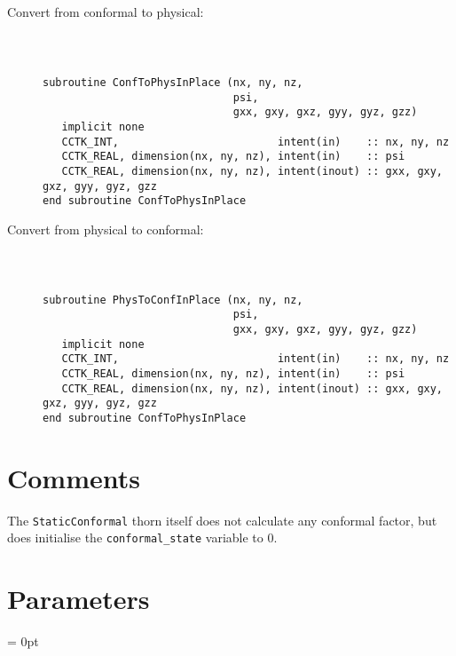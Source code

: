 \documentclass{article}
\newlength{\tableWidth} \newlength{\maxVarWidth} \newlength{\paraWidth} \newlength{\descWidth}
\begin{document}
\begin{description}

\item[Convert from conformal to physical:]

{\tt
\begin{verbatim}

subroutine ConfToPhysInPlace (nx, ny, nz,
                              psi,
                              gxx, gxy, gxz, gyy, gyz, gzz)
   implicit none
   CCTK_INT,                         intent(in)    :: nx, ny, nz
   CCTK_REAL, dimension(nx, ny, nz), intent(in)    :: psi
   CCTK_REAL, dimension(nx, ny, nz), intent(inout) :: gxx, gxy, gxz, gyy, gyz, gzz
end subroutine ConfToPhysInPlace
\end{verbatim}
}

\item[Convert from physical to conformal:]

{\tt
\begin{verbatim}

subroutine PhysToConfInPlace (nx, ny, nz,
                              psi,
                              gxx, gxy, gxz, gyy, gyz, gzz)
   implicit none
   CCTK_INT,                         intent(in)    :: nx, ny, nz
   CCTK_REAL, dimension(nx, ny, nz), intent(in)    :: psi
   CCTK_REAL, dimension(nx, ny, nz), intent(inout) :: gxx, gxy, gxz, gyy, gyz, gzz
end subroutine ConfToPhysInPlace
\end{verbatim}
}

\end{description}

\section{Comments}

The {\tt StaticConformal} thorn itself does not calculate any conformal
factor, but does initialise the {\tt conformal\_state} variable to 0. 




\section{Parameters} 


\parskip = 0pt

\setlength{\tableWidth}{160mm}

\setlength{\paraWidth}{\tableWidth}
\setlength{\descWidth}{\tableWidth}
\settowidth{\maxVarWidth}{conformal\_storage}
\end{document}
